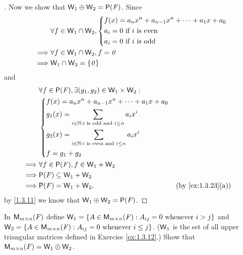\begin{proof}[]
  Now we show that \(\W_1 \oplus \W_2 = \ps{\F}\).
  Since
  \begin{align*}
             & \forall f \in \mathsf{W}_1 \cap \mathsf{W}_2, \begin{dcases}
      f(x) = a_n x^n + a_{n - 1} x^n + \cdots + a_1 x + a_0 \\
      a_i = 0 \text{ if } i \text{ is even}                 \\
      a_i = 0 \text{ if } i \text{ is odd}
    \end{dcases} \\
    \implies & \forall f \in \mathsf{W}_1 \cap \mathsf{W}_2, f = \mathit{0}                    \\
    \implies & \mathsf{W}_1 \cap \mathsf{W}_2 = \left\lbrace\mathit{0}\right\rbrace
  \end{align*}
  and
  \begin{align*}
             & \forall f \in \ps{\F}, \exists (g_1, g_2) \in \W_1 \times \W_2 :                                      \\
             & \begin{dcases}
      f(x) = a_n x^n + a_{n - 1} x^n + \cdots + a_1 x + a_0              \\
      g_1(x) = \sum_{i \in \N : i \text{ is odd and } i \leq n} a_i x^i  \\
      g_2(x) = \sum_{i \in \N : i \text{ is even and } i \leq n} a_i x^i \\
      f = g_1 + g_2
    \end{dcases}                                                                            \\
    \implies & \forall f \in \ps{\F}, f \in \W_1 + \W_2                                                              \\
    \implies & \ps{\F} \subseteq \W_1 + \W_2                                                                         \\
    \implies & \ps{\F} = \W_1 + \W_2,                                           &  & \text{(by \cref{ex:1.3.23}(a))}
  \end{align*}
  by \cref{1.3.11} we know that \(\W_1 \oplus \W_2 = \ps{\F}\).
\end{proof}

\begin{ex}\label{ex:1.3.26}
  In \(\mathsf{M}_{{m} \times n}({\mathit{F}})\) define \(\mathsf{W}_1 = \left\lbrace A \in \mathsf{M}_{{m} \times n}({\mathit{F}}) : A_{i j} = 0 \text{ whenever } i > j\right\rbrace\) and \(\mathsf{W}_2 = \left\lbrace A \in \mathsf{M}_{{m} \times n}({\mathit{F}}) : A_{i j} = 0 \text{ whenever } i \leq j\right\rbrace\).
  (\(\mathsf{W}_1\) is the set of all upper triangular matrices defined in Exercise \cref{ex:1.3.12}.)
  Show that \(\mathsf{M}_{{m} \times n}({\mathit{F}}) = \mathsf{W}_1 \oplus \mathsf{W}_2\).
\end{ex}

